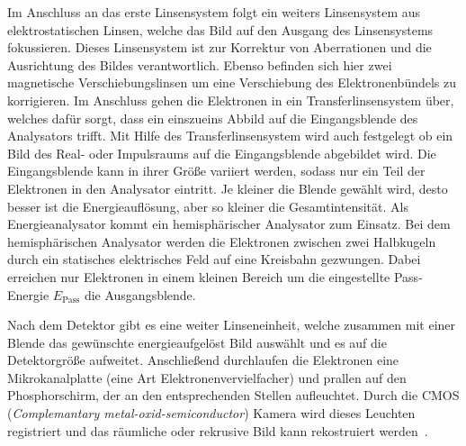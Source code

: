         Im Anschluss an das erste Linsensystem folgt ein weiters Linsensystem aus elektrostatischen Linsen, welche das Bild auf den Ausgang des Linsensystems fokussieren.
        Dieses Linsensystem ist zur Korrektur von Aberrationen und die Ausrichtung des Bildes verantwortlich.
        Ebenso befinden sich hier zwei magnetische Verschiebungslinsen um eine Verschiebung des Elektronenbündels zu korrigieren.
        Im Anschluss gehen die Elektronen in ein Transferlinsensystem über, welches dafür sorgt, dass ein einszueins Abbild auf die Eingangsblende des Analysators trifft.
        Mit Hilfe des Transferlinsensystem wird auch festgelegt ob ein Bild des Real- oder Impulsraums auf die Eingangsblende abgebildet wird.
        Die Eingangsblende kann in ihrer Größe variiert werden, sodass nur ein Teil der Elektronen in den Analysator eintritt.
        Je kleiner die Blende gewählt wird, desto besser ist die Energieauflösung, aber so kleiner die Gesamtintensität.
        Als Energieanalysator kommt ein hemisphärischer Analysator zum Einsatz.
        Bei dem hemisphärischen Analysator werden die Elektronen zwischen zwei Halbkugeln durch ein statisches elektrisches Feld auf eine Kreisbahn gezwungen.
        Dabei erreichen nur Elektronen in einem kleinen Bereich um die eingestellte Pass-Energie $E_\text{Pass}$ die Ausgangsblende.
        
        Nach dem Detektor gibt es eine weiter Linseneinheit, welche zusammen mit einer Blende das gewünschte energieaufgelöst Bild auswählt und es auf die Detektorgröße aufweitet.
        Anschließend durchlaufen die Elektronen eine Mikrokanalplatte (eine Art Elektronenvervielfacher) und prallen auf den Phosphorschirm, der an den entsprechenden Stellen aufleuchtet.
        Durch die CMOS (\textit{Complemantary metal-oxid-semiconductor}) Kamera wird dieses Leuchten registriert und das räumliche oder rekrusive Bild kann rekostruiert werden~\cite{SPECS-MM}.
        
